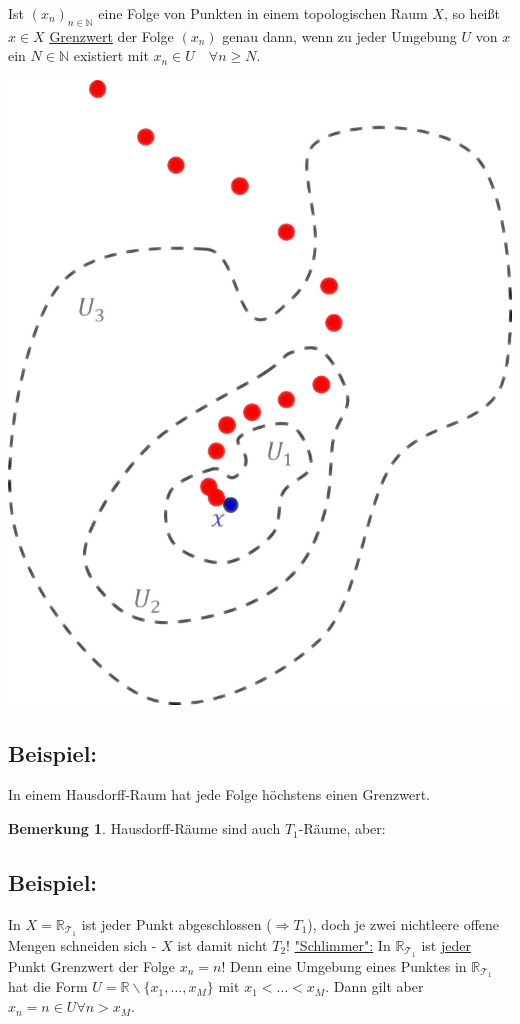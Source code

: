 \documentclass[a4paper,11pt,notitlepage]{report}
\theoremstyle{definition}
\newtheorem{remark}{Bemerkung}[chapter]
\newcommand{\R}{{\ensuremath{\mathbb{R}}}}
\newcommand{\N}{{\ensuremath{\mathbb{N}}}}
\newenvironment{bsp}[1]
{
\setlength{\fboxsep}{10pt}
\subsection*{Beispiel: #1}
\begin{upshape}
}
{
\end{upshape}
}
\newenvironment{definition}[1]{
	\begin{definitions}
	\marginnote{\emph{#1}}
}{\end{definitions}}
\begin{document}
\begin{definition}{Grenzwert}
Ist $(x_n)_{n \in \N}$ eine Folge von Punkten in einem topologischen Raum $X$, so heißt $x \in X$ \underline{Grenzwert} der Folge $(x_n)$ genau dann, wenn zu jeder Umgebung $U$ von $x$ ein $N \in \N$ existiert mit $x_n \in U \quad \forall n \geq N$. 
\newline
\end{definition}
\begin{center}
	\includegraphics[scale=0.5]{images/Grenzwert.png}
\end{center}

\begin{bsp}{}
In einem Hausdorff-Raum hat jede Folge höchstens einen Grenzwert.
\end{bsp}

\begin{remark}
Hausdorff-Räume sind auch $T_1$-Räume, aber:
\end{remark}

\begin{bsp}{}
	In $X=\R_{\mathcal{T}_1}$ ist jeder Punkt abgeschlossen ($\Rightarrow T_1$), doch je zwei nichtleere offene Mengen schneiden sich - $X$ ist damit nicht $T_2$!
	\underline{"Schlimmer":} In $\R_{\mathcal{T}_1}$ ist \underline{jeder} Punkt Grenzwert der Folge $x_n = n$!
	Denn eine Umgebung eines Punktes in $\R_{\mathcal{T}_1}$ hat die Form $U = \R \backslash \{x_1, \ldots, x_M\}$ mit $x_1 < \ldots < x_M$. Dann gilt aber $x_n = n \in U \forall n > x_M$.
\end{bsp}
\end{document}
